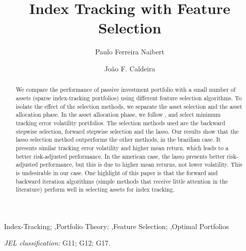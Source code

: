 \documentclass[preprint, doubleblind, authoryear,10pt]{elsarticle}
\begin{document}

\begin{frontmatter}

\title{Index Tracking with Feature Selection}%

\author[Label1]{Paulo Ferreira Naibert}
\author[Label2]{Jo\~ao F. Caldeira}
\address[Label1]{PhD Candidate at the Economics Department of the Federal University of Rio Grande do Sul}
\address[Label2]{Department of Economics, Universidade Federal de Santa Catarina}

\begin{abstract}
\noindent
We compare the performance of passive investment portfolio with a small number of assets (sparse index-tracking portfolios) using different feature selection algorithms.
To isolate the effect of the selection methods, we separate the asset selection and the asset allocation phase.
In the asset allocation phase, we follow \cite{liu-2009}, and select minimum tracking error volatility portfolios.
The selection methods used are the backward stepwise selection, forward stepwise selection and the lasso.
Our results show that the lasso selection method outperforms the other methods, in the brazilian case.
It presents similar tracking error volatility and higher mean return, which leads to a better risk-adjusted performance.
In the american case, the lasso presents better risk-adjusted performance, but this is due to higher mean returns, not lower volatility.
This is undesirable in our case.
One highlight of this paper is that the forward and backward iteration algorithms (simple methods that receive little attention in the literature) perform well in selecting assets for index tracking.
\end{abstract}


\begin{keyword}
Index-Tracking; \sep Portfolio Theory; \sep Feature Selection; \sep Optimal Portfolios 

\noindent\textit{JEL classification:} G11; G12; G17.
\end{keyword}

\end{frontmatter}
\end{document}
